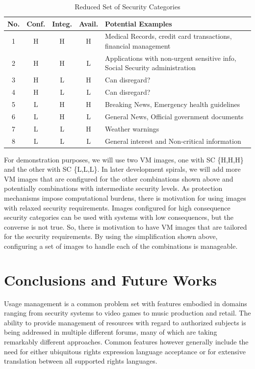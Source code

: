 \documentclass{sig-alternate}
\begin{document}
\begin{table}
\begin{tabular}{|c|c|c|c|p{1.3in}|}
\hline
No. & Conf. & Integ. & Avail. & Potential Examples \\
\hline
1 & H & H & H & Medical Records, 
credit card transactions,
financial management \\
\hline
2 & H & H & L & Applications with non-urgent sensitive info, 
Social Security administration \\
\hline
3 & H & L & H & Can disregard? \\
\hline
4 & H & L & L & Can disregard? \\
\hline
5 & L & H & H & Breaking News, 
                Emergency health guidelines \\
\hline
6 & L & H & L & General News,
                Official government documents \\
\hline
7 & L & L & H & Weather warnings \\
\hline
8 & L & L & L & General interest and
                Non-critical information \\
\hline
\end{tabular} 
\caption{Reduced Set of Security Categories}
\end{table}

For demonstration purposes, we will use two VM images, one with SC \{H,H,H\} and the other with SC \{L,L,L\}.  In later development spirals, we will add more VM images that are configured  for the other combinations shown above and potentially combinations with intermediate security levels.  As protection mechanisms impose computational burdens, there is motivation for using images with relaxed security requirements. Images configured for high consequence security categories can be used with systems with low consequences, but the converse is not true.  So, there is motivation to have VM images that are tailored for the security requirements.  By using the simplification shown above, configuring a set of images to handle each of the combinations is manageable. 

\section{Conclusions and Future Works}
Usage management is a common problem set with features embodied in domains ranging from security systems to video games to music production and retail.  The ability to provide management of resources with regard to authorized subjects is being addressed in multiple different forums, many of which are taking remarkably different approaches.  Common features however generally include the need for either ubiquitous rights expression language acceptance or for extensive translation between all supported rights languages.
\end{document}
